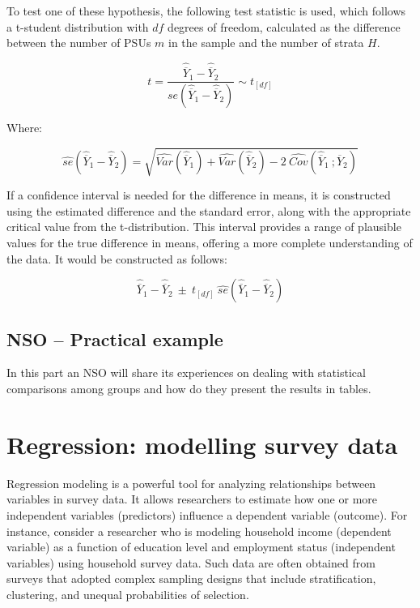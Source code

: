 \documentclass[
  12pt,
]{book}
\begin{document}
To test one of these hypothesis, the following test statistic is used, which follows a t-student distribution with \(df\) degrees of freedom, calculated as the difference between the number of PSUs \(m\) in the sample and the number of strata \(H\).

\[
t = \frac{\widehat{\overline{Y}}_{1} - \widehat{\overline{Y}}_{2}} {se\left(\widehat{\overline{Y}}_{1} - \widehat{\overline{Y}}_{2}\right)} \sim t_{[df]}
\]

Where:

\[
\widehat{se} \left( \widehat{\overline{Y}}_{1} - \widehat{\overline{Y}}_{2} \right) = \sqrt{\widehat{Var}\left(\widehat{\overline{Y}}_{1}\right) + \widehat{Var}\left(\widehat{\overline{Y}}_{2}\right) - 2 \  \widehat{Cov}\left(\widehat{\overline{Y}}_{1} \ ; \widehat{\overline{Y}}_{2} \right)}
\]

If a confidence interval is needed for the difference in means, it is constructed using the estimated difference and the standard error, along with the appropriate critical value from the t-distribution. This interval provides a range of plausible values for the true difference in means, offering a more complete understanding of the data. It would be constructed as follows:

\[
\widehat{\overline{Y}}_{1} - \widehat{\overline{Y}}_{2} \ \pm \ t_{[df]} \ \widehat{se}\left( \widehat{\overline{Y}}_{1} - \widehat{\overline{Y}}_{2} \right)
\]

\hypertarget{nso-practical-example-1}{%
\section{NSO -- Practical example}\label{nso-practical-example-1}}

In this part an NSO will share its experiences on dealing with statistical comparisons among groups and how do they present the results in tables.

\hypertarget{regression-modelling-survey-data}{%
\chapter{Regression: modelling survey data}\label{regression-modelling-survey-data}}

Regression modeling is a powerful tool for analyzing relationships between variables in survey data. It allows researchers to estimate how one or more independent variables (predictors) influence a dependent variable (outcome). For instance, consider a researcher who is modeling household income (dependent variable) as a function of education level and employment status (independent variables) using household survey data. Such data are often obtained from surveys that adopted complex sampling designs that include stratification, clustering, and unequal probabilities of selection.
\end{document}
